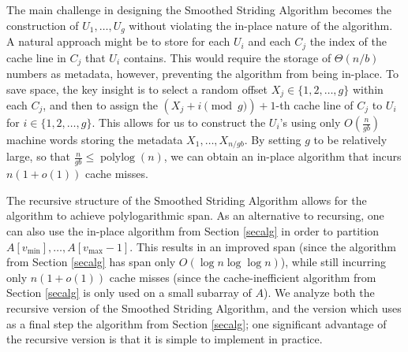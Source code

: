 \documentclass[sigplan, 10pt, nonacm]{acmart}
\newcommand{\defn}[1]{{\textit{\textbf{\boldmath #1}}}}
\theoremstyle{remark}
\theoremstyle{remark}
\begin{document}
The main challenge in designing the Smoothed Striding Algorithm
becomes the construction of $U_1, \ldots, U_{g}$ without
violating the in-place nature of the algorithm. A natural approach
might be to store for each $U_i$ and each $C_j$ the index of the cache
line in $C_j$ that $U_i$ contains. This would require the storage of
$\Theta(n / b)$ numbers as metadata, however, preventing the algorithm
from being in-place. To save space, the key insight is to select a
random offset $X_j \in \{1, 2, \ldots, g\}$ within each $C_j$, and
then to assign the $(X_j + i \pmod g) + 1$-th cache line of $C_j$ to
$U_i$ for $i \in \{1, 2, \ldots, g\}$. This allows for us to construct
the $U_i$'s using only $O\left(\frac{n}{gb}\right)$ machine words
storing the metadata $X_1, \ldots, X_{n / gb}$. By setting $g$ to
be relatively large, so that $\frac{n}{gb} \le
\operatorname{polylog}(n)$, we can obtain an in-place algorithm that
incurs $n (1 + o(1))$ cache misses.

The recursive structure of the Smoothed Striding Algorithm allows for
the algorithm to achieve polylogarithmic span. As an alternative to
recursing, one can also use the in-place algorithm from Section
\ref{secalg} in order to partition \\ $A[v_{\text{min}}], \ldots,
  A[v_{\text{max}} - 1]$. This results in an improved span (since the
algorithm from Section \ref{secalg} has span only $O(\log n \log \log
n)$), while still incurring only $n (1 + o(1))$ cache misses (since
the cache-inefficient algorithm from Section \ref{secalg} is only used
on a small subarray of $A$). We analyze both the recursive version of
the Smoothed Striding Algorithm, and the version which uses as a final
step the algorithm from Section \ref{secalg}; one significant advantage
of the recursive version is that it is simple to implement in
practice.






\end{document}
